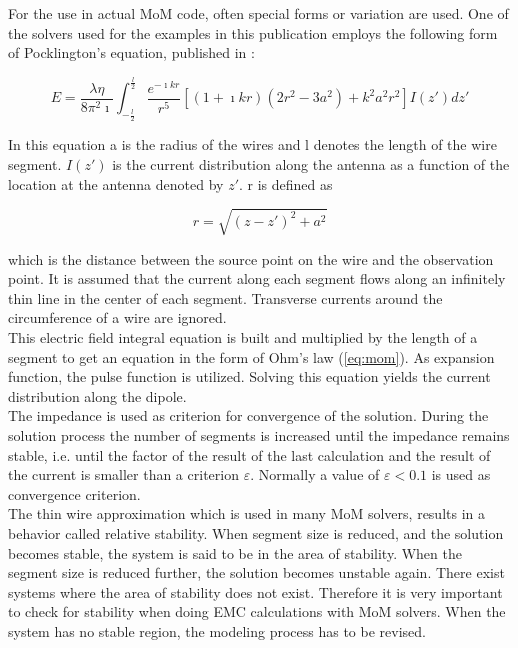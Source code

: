 \documentclass[a4paper,11pt]{article}
\begin{document}
For the use in actual MoM code, often special forms or variation are used. One of the solvers used for the examples in this publication employs the following form of Pocklington's equation, published in \cite{richmond66}:

\begin{equation}
E=\frac{\lambda \eta}{8 \pi^2 \imath} \int_{-\frac{l}{2}}^{\frac{l}{2}} \frac{e^{-\imath k r}}{r^5} \left[ (1+\imath k r)(2 r^2-3a^2)+k^2a^2r^2\right]I(z') dz'
\end{equation}

In this equation a is the radius of the wires and l denotes the length of the wire segment. $I(z')$ is the current distribution along the antenna as a function of the location at the antenna denoted by $z'$. r is defined as

\begin{equation}
 r=\sqrt{(z-z')^2+a^2}
\end{equation}

which is the distance between the source point on the wire and the observation point. It is assumed that the current along each segment flows along an infinitely thin line in the center of each segment. Transverse currents around the circumference of a wire are ignored.\\

This electric field integral equation is built and multiplied by the length of a segment to get an equation in the form of Ohm's law (\ref{eq:mom}). As expansion function, the pulse function is utilized. Solving this equation yields the current distribution along the dipole.\\

The impedance is used as criterion for convergence of the solution. During the solution process the number of segments is increased until the impedance remains stable, i.e. until the factor of the result of the last calculation and the result of the current is smaller than a criterion $\varepsilon$. Normally a value of $\varepsilon < 0.1$ is used as convergence criterion.\\

 The thin wire approximation which is used in many MoM solvers, results in a behavior called relative stability. When segment size is reduced, and the solution becomes stable, the system is said to be in the area of stability. When the segment size is reduced further, the solution becomes unstable again. There exist systems where the area of stability does not exist. Therefore it is very important to check for stability when doing EMC calculations with MoM solvers. When the system has no stable region, the modeling process has to be revised.\\
\end{document}
